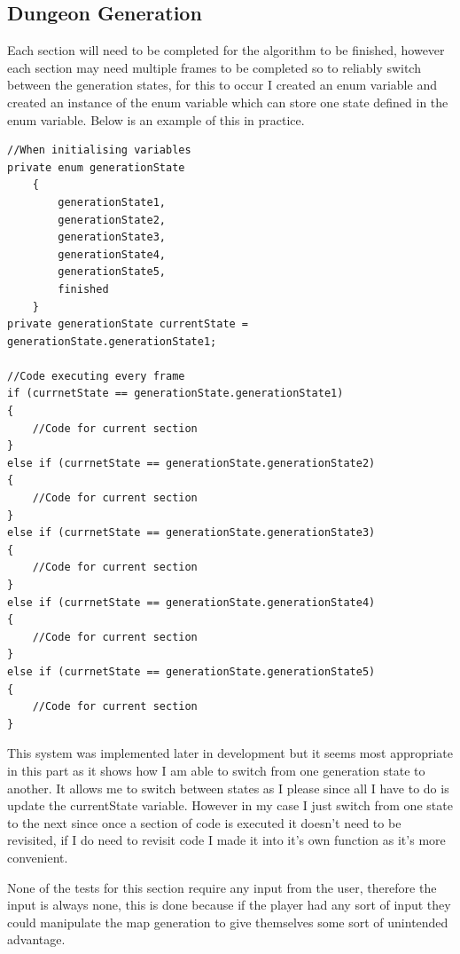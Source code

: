 \documentclass{article}
\newcommand{\parBr}{\vspace{5mm}}%
\begin{document}
\subsection{Dungeon Generation}
Each section will need to be completed for the algorithm to be finished, however each section may need multiple frames to be completed so to reliably switch between the generation states, for this to occur I created an enum variable and created an instance of the enum variable which can store one state defined in the enum variable. Below is an example of this in practice.
\begin{lstlisting}
//When initialising variables
private enum generationState
    {
        generationState1,
        generationState2,
        generationState3,
        generationState4,
        generationState5,
        finished
    }
private generationState currentState = generationState.generationState1;

//Code executing every frame
if (currnetState == generationState.generationState1)
{
	//Code for current section
}
else if (currnetState == generationState.generationState2)
{
	//Code for current section
}
else if (currnetState == generationState.generationState3)
{
	//Code for current section
}
else if (currnetState == generationState.generationState4)
{
	//Code for current section
}
else if (currnetState == generationState.generationState5)
{
	//Code for current section
}
\end{lstlisting}
This system was implemented later in development but it seems most appropriate in this part as it shows how I am able to switch from one generation state to another. It allows me to switch between states as I please since all I have to do is update the currentState variable. However in my case I just switch from one state to the next since once a section of code is executed it doesn't need to be revisited, if I do need to revisit code I made it into it's own function as it's more convenient.

\parBr

None of the tests for this section require any input from the user, therefore the input is always none, this is done because if the player had any sort of input they could manipulate the map generation to give themselves some sort of unintended advantage.
\end{document}
